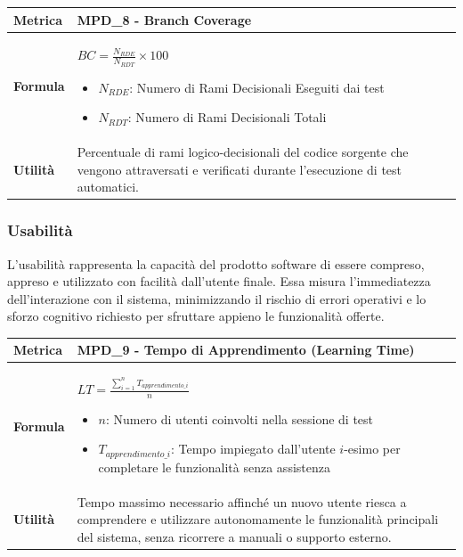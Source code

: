 \documentclass[12pt, a4paper]{article}
\begin{document}
\begin{table}[H]
\centering
\renewcommand{\arraystretch}{1.5}
\begin{tabular}{|l|p{12cm}|}
\hline
\textbf{Metrica} & MPD\_8 - Branch Coverage \\ \hline
\textbf{Formula} & $BC = \frac{N_{RDE}}{N_{RDT}} \times 100$
\begin{itemize}
    \item $N_{RDE}$: Numero di Rami Decisionali Eseguiti dai test
    \item $N_{RDT}$: Numero di Rami Decisionali Totali
\end{itemize} \\ \hline
\textbf{Utilità} & Percentuale di rami logico-decisionali del codice sorgente che vengono attraversati e verificati durante l'esecuzione di test automatici. \\ \hline
\end{tabular}
\end{table}

\subsubsection{Usabilità}
L'usabilità rappresenta la capacità del prodotto software di essere compreso, appreso e utilizzato con facilità dall'utente finale. Essa misura l'immediatezza dell'interazione con il sistema, minimizzando il rischio di errori operativi e lo sforzo cognitivo richiesto per sfruttare appieno le funzionalità offerte.

\begin{table}[H]
\centering
\renewcommand{\arraystretch}{1.5}
\begin{tabular}{|l|p{12cm}|}
\hline
\textbf{Metrica} & MPD\_9 - Tempo di Apprendimento (Learning Time) \\ \hline
\textbf{Formula} & $LT = \frac{\sum_{i=1}^{n} T_{apprendimento\_i}}{n}$
\begin{itemize}
    \item $n$: Numero di utenti coinvolti nella sessione di test
    \item $T_{apprendimento\_i}$: Tempo impiegato dall'utente $i$-esimo per completare le funzionalità senza assistenza
\end{itemize} \\ \hline
\textbf{Utilità} & Tempo massimo necessario affinché un nuovo utente riesca a comprendere e utilizzare autonomamente le funzionalità principali del sistema, senza ricorrere a manuali o supporto esterno. \\ \hline
\end{tabular}
\end{table}
\end{document}
